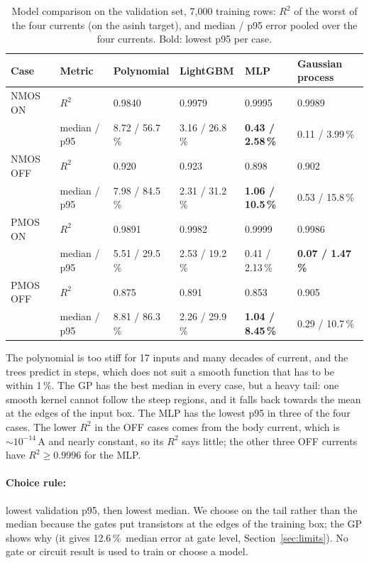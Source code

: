 \documentclass[11pt,a4paper]{article}
\newcommand{\pct}{\,\%}
\begin{document}
\begin{table}[H]
\centering
\caption{Model comparison on the validation set, 7,000 training rows: $R^2$ of the worst of the
four currents (on the asinh target), and median / p95 error pooled over the four currents. Bold:
lowest p95 per case.}
\label{tab:compare}
\small
\begin{tabular}{llllll}
\toprule
Case & Metric & Polynomial & LightGBM & MLP & Gaussian process \\
\midrule
NMOS ON  & $R^2$ & 0.9840 & 0.9979 & 0.9995 & 0.9989 \\
         & median / p95 & 8.72 / 56.7\pct & 3.16 / 26.8\pct & \textbf{0.43 / 2.58\pct} & 0.11 / 3.99\pct \\
\addlinespace
NMOS OFF & $R^2$ & 0.920 & 0.923 & 0.898 & 0.902 \\
         & median / p95 & 7.98 / 84.5\pct & 2.31 / 31.2\pct & \textbf{1.06 / 10.5\pct} & 0.53 / 15.8\pct \\
\addlinespace
PMOS ON  & $R^2$ & 0.9891 & 0.9982 & 0.9999 & 0.9986 \\
         & median / p95 & 5.51 / 29.5\pct & 2.53 / 19.2\pct & 0.41 / 2.13\pct & \textbf{0.07 / 1.47\pct} \\
\addlinespace
PMOS OFF & $R^2$ & 0.875 & 0.891 & 0.853 & 0.905 \\
         & median / p95 & 8.81 / 86.3\pct & 2.26 / 29.9\pct & \textbf{1.04 / 8.45\pct} & 0.29 / 10.7\pct \\
\bottomrule
\end{tabular}
\end{table}

The polynomial is too stiff for 17 inputs and many decades of current, and the trees predict in
steps, which does not suit a smooth function that has to be within 1\pct. The GP has the best median
in every case, but a heavy tail: one smooth kernel cannot follow the steep regions, and it falls back
towards the mean at the edges of the input box. The MLP has the lowest p95 in three of the four cases.
The lower $R^2$ in the OFF cases comes from the body current, which is $\sim\!10^{-14}$\,A and nearly
constant, so its $R^2$ says little; the other three OFF currents have $R^2 \geq 0.9996$ for the MLP.

\paragraph{Choice rule:} lowest validation p95, then lowest median. We choose on the tail rather than
the median because the gates put transistors at the edges of the training box; the GP shows why (it
gives 12.6\pct\ median error at gate level, Section~\ref{sec:limits}). No gate or circuit result is
used to train or choose a model.
\end{document}
